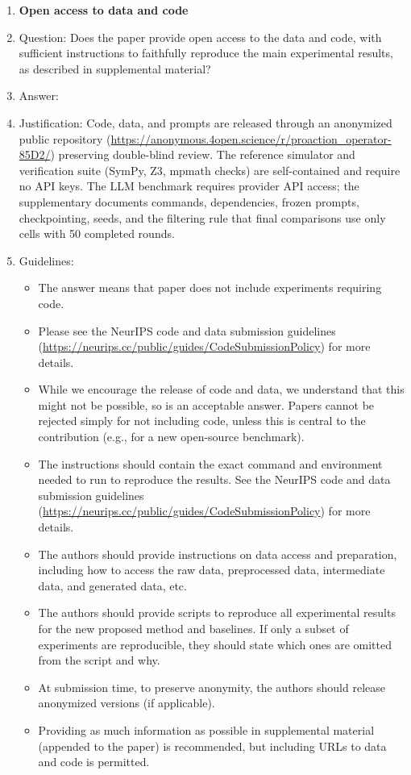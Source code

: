 \begin{enumerate}
\item {\bf Open access to data and code}
    \item[] Question: Does the paper provide open access to the data and code, with sufficient instructions to faithfully reproduce the main experimental results, as described in supplemental material?
    \item[] Answer: \answerNo{}
    \item[] Justification: Code, data, and prompts are released through an anonymized public repository (\url{https://anonymous.4open.science/r/proaction_operator-85D2/}) preserving double-blind review. The reference simulator and verification suite (SymPy, Z3, mpmath checks) are self-contained and require no API keys. The LLM benchmark requires provider API access; the supplementary documents commands, dependencies, frozen prompts, checkpointing, seeds, and the filtering rule that final comparisons use only cells with 50 completed rounds.
    \item[] Guidelines:
    \begin{itemize}
        \item The answer \answerNA{} means that paper does not include experiments requiring code.
        \item Please see the NeurIPS code and data submission guidelines (\url{https://neurips.cc/public/guides/CodeSubmissionPolicy}) for more details.
        \item While we encourage the release of code and data, we understand that this might not be possible, so \answerNo{} is an acceptable answer. Papers cannot be rejected simply for not including code, unless this is central to the contribution (e.g., for a new open-source benchmark).
        \item The instructions should contain the exact command and environment needed to run to reproduce the results. See the NeurIPS code and data submission guidelines (\url{https://neurips.cc/public/guides/CodeSubmissionPolicy}) for more details.
        \item The authors should provide instructions on data access and preparation, including how to access the raw data, preprocessed data, intermediate data, and generated data, etc.
        \item The authors should provide scripts to reproduce all experimental results for the new proposed method and baselines. If only a subset of experiments are reproducible, they should state which ones are omitted from the script and why.
        \item At submission time, to preserve anonymity, the authors should release anonymized versions (if applicable).
        \item Providing as much information as possible in supplemental material (appended to the paper) is recommended, but including URLs to data and code is permitted.
    \end{itemize}



\end{enumerate}
